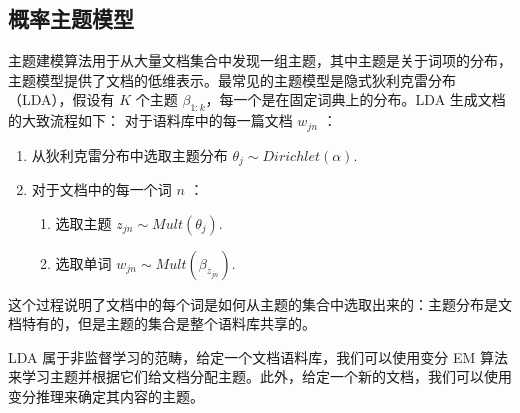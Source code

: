 \subsection{概率主题模型} %
\label{sub:概率主题模型}
主题建模算法用于从大量文档集合中发现一组主题，其中主题是关于词项的分布，主题模型提供了文档的低维表示\cite{Chang2009Reading}。最常见的主题模型是隐式狄利克雷分布（LDA）\cite{Blei2003Latent}，假设有 $K$ 个主题 $\beta_{1:k}$，每一个是在固定词典上的分布。LDA 生成文档的大致流程如下：
对于语料库中的每一篇文档 $w_{jn}$ ：
\begin{enumerate}[itemindent=1em]
\item 从狄利克雷分布中选取主题分布 $\theta_j \sim Dirichlet(\alpha).$
\item 对于文档中的每一个词 $n$ ：
	\begin{enumerate}[itemindent=1em]
		\item 选取主题 $z_{jn} \sim Mult(\theta_j).$
		\item 选取单词 $w_{jn} \sim Mult(\beta_{z_{jn}}).$ 
	\end{enumerate}
\end{enumerate}
这个过程说明了文档中的每个词是如何从主题的集合中选取出来的：主题分布是文档特有的，但是主题的集合是整个语料库共享的。

LDA 属于非监督学习的范畴，给定一个文档语料库，我们可以使用变分 EM 算法来学习主题并根据它们给文档分配主题\cite{Blei2003Latent}。此外，给定一个新的文档，我们可以使用变分推理来确定其内容的主题。

